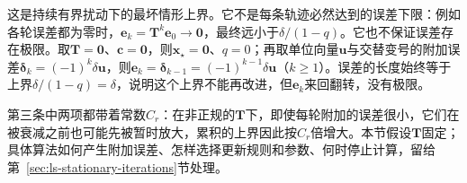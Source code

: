 这是持续有界扰动下的最坏情形上界。它不是每条轨迹必然达到的误差下限：例如各轮误差都为零时，$\bm e_k=\bm T^k\bm e_0\to\bm0$，最终远小于$\delta/(1-q)$。它也不保证误差存在极限。取$\bm T=\bm0$、$\bm c=\bm0$，则$\bm x_\star=\bm0$、$q=0$；再取单位向量$\bm u$与交替变号的附加误差$\bm\delta_k=(-1)^k\delta\bm u$，则$\bm e_k=\bm\delta_{k-1}=(-1)^{k-1}\delta\bm u$（$k\geq1$）。误差的长度始终等于上界$\delta/(1-q)=\delta$，说明这个上界不能再改进，但$\bm e_k$来回翻转，没有极限。

第三条中两项都带着常数$C_r$：在非正规的$\bm T$下，即使每轮附加的误差很小，它们在被衰减之前也可能先被暂时放大，累积的上界因此按$C_r$倍增大。本节假设$\bm T$固定；具体算法如何产生附加误差、怎样选择更新规则和参数、何时停止计算，留给第~\ref{sec:ls-stationary-iterations}节处理。
